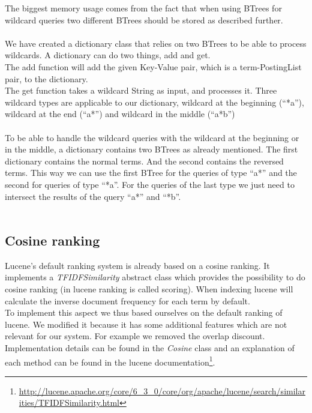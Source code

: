 \documentclass{article}
\begin{document}
The biggest memory usage comes from the fact that when  using BTrees for wildcard queries two different BTrees should be stored as described further.\\\\
We have created a dictionary class that relies on two BTrees to be able to process wildcards. A dictionary can do two things, add and get.\\
The add function will add the given Key-Value pair, which is a term-PostingList pair, to the dictionary.\\
The get function takes a wildcard String as input, and processes it. Three wildcard types are applicable to our dictionary, wildcard at the beginning (``*a''), wildcard at the end (``a*'') and wildcard in the middle (``a*b'')\\\\
To be able to handle the wildcard queries with the wildcard at the beginning or in the middle, a dictionary contains two BTrees as already mentioned. The first dictionary contains the normal terms. And the second contains the reversed terms. This way we can use the first BTree for the queries of type ``a*'' and the second for queries of type ``*a''. For the queries of the last type we just need to intersect the results of the query ``a*'' and ``*b''.\\\\
\subsection{Cosine ranking}
Lucene's default ranking system is already based on a cosine ranking. It implements a \emph{TFIDFSimilarity} abstract class which provides the possibility to do cosine ranking (in lucene ranking is called scoring). When indexing lucene will calculate the inverse document frequency for each term by default.\\
To implement this aspect we thus based ourselves on the default ranking of lucene. We modified it because it has some additional features which are not relevant for our system. For example we removed the overlap discount. Implementation details can be found in the \emph{Cosine} class and an explanation of each method can be found in the lucene documentation\footnote{\url{http://lucene.apache.org/core/6_3_0/core/org/apache/lucene/search/similarities/TFIDFSimilarity.html}}.
\end{document}
